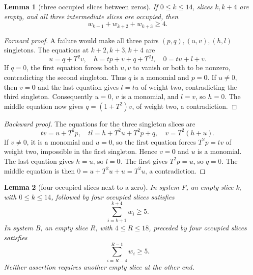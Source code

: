\documentclass{article}
\newtheorem{lemma}{Lemma}
\begin{document}
\begin{lemma}[three occupied slices between zeros]\label{lem:three}
  If \(0 \le k \le 14\), slices \(k, k + 4\) are empty, and all three intermediate slices are
  occupied, then
  \begin{equation}
    w_{k+1} + w_{k+2} + w_{k+3} \ge 4.
  \end{equation}
\end{lemma}

\begin{proof}[Forward proof]
  A failure would make all three pairs \((p,q), (u,v), (h,l)\) singletons. The equations at
  \(k + 2, k + 3, k + 4\) are
  \begin{equation}
    u = q + T^2 v, \quad h = tp + v + q + T^2 l, \quad 0 = tu + l + v.
  \end{equation}
  If \(q = 0\), the first equation forces both \(u, v\) to vanish or both to be nonzero,
  contradicting the second singleton. Thus \(q\) is a monomial and \(p = 0\). If \(u \ne 0\), then
  \(v = 0\) and the last equation gives \(l = tu\) of weight two, contradicting the third
  singleton. Consequently \(u = 0\), \(v\) is a monomial, and \(l = v\), so \(h = 0\). The middle
  equation now gives \(q = (1 + T^2)v\), of weight two, a contradiction.
\end{proof}

\begin{proof}[Backward proof]
  The equations for the three singleton slices are
  \begin{equation}
    tv = u + T^2 p, \quad tl = h + T^2 u + T^2 p + q, \quad v = T^2 (h + u).
  \end{equation}
  If \(v \ne 0\), it is a monomial and \(u = 0\), so the first equation forces \(T^2 p = tv\) of
  weight two, impossible in the first singleton. Hence \(v = 0\) and \(u\) is a monomial. The last
  equation gives \(h = u\), so \(l = 0\). The first gives \(T^2 p = u\), so \(q = 0\). The middle
  equation is then \(0 = u + T^2 u + u = T^2 u\), a contradiction.
\end{proof}

\begin{lemma}[four occupied slices next to a zero]\label{lem:four}
  In system F, an empty slice \(k\), with \(0 \le k \le 14\), followed by four occupied slices
  satisfies
  \begin{equation}
    \sum_{i=k+1}^{k+4} w_i \ge 5.
  \end{equation}
  In system B, an empty slice \(R\), with \(4 \le R \le 18\), preceded by four occupied slices
  satisfies
  \begin{equation}
    \sum_{i=R-4}^{R-1} w_i \ge 5.
  \end{equation}
  Neither assertion requires another empty slice at the other end.
\end{lemma}
\end{document}
